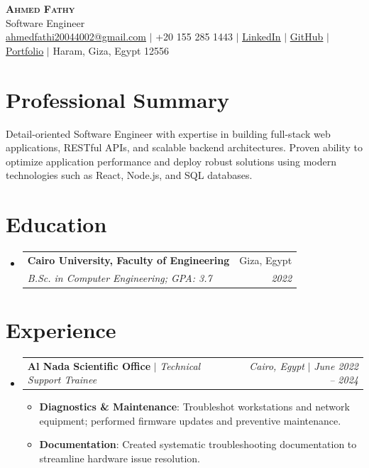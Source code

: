 \documentclass[letterpaper,11pt]{article}
\makeatletter
\newcommand{\resumeItem}[2]{\item\small{\textbf{#1}{: #2 \vspace{-2pt}}}}
\newcommand{\resumeSubheading}[4]{
  \vspace{-1pt}\item
    \begin{tabular*}{0.97\textwidth}{l@{\extracolsep{\fill}}r}
      \textbf{#1} & #2 \\
      \textit{\small#3} & \textit{\small #4} \\
    \end{tabular*}\vspace{-5pt}
}
\newcommand{\resumeActivitySubheading}[4]{
  \vspace{-1pt}\item
    \begin{tabular*}{0.97\textwidth}{l@{\extracolsep{\fill}}r}
      \textbf{#1} $|$ \textit{\small#3} & \textit{\small#2} $|$ \textit{\small #4} \\
    \end{tabular*}\vspace{-5pt}
}
\newcommand{\resumeSubHeadingListStart}{\begin{itemize}[leftmargin=*]}
\newcommand{\resumeSubHeadingListEnd}{\end{itemize}}
\newcommand{\resumeItemListStart}{\begin{itemize}}
\newcommand{\resumeItemListEnd}{\end{itemize}\vspace{-5pt}}
\makeatother
\begin{document}
\begin{center}
    \textbf{\Huge \scshape Ahmed Fathy} \\ \vspace{1pt}
    \small Software Engineer \\
    \href{mailto:ahmedfathi20044002@gmail.com}{\underline{ahmedfathi20044002@gmail.com}} $|$
    +20 155 285 1443 $|$
    \href{https://www.linkedin.com/in/ahmedfathy-x1}{\underline{LinkedIn}} $|$
    \href{https://github.com/ahmedfathy0-0}{\underline{GitHub}} $|$
    \href{https://www.mrfathi.tech/}{\underline{Portfolio}} $|$
    Haram, Giza, Egypt 12556
\end{center}


\section{Professional Summary}
  \small Detail-oriented Software Engineer with expertise in building full-stack web applications, RESTful APIs, and scalable backend architectures. Proven ability to optimize application performance and deploy robust solutions using modern technologies such as React, Node.js, and SQL databases.
  \vspace{8pt}
\section{Education}
  \resumeSubHeadingListStart
    \resumeSubheading
      {Cairo University, Faculty of Engineering}{Giza, Egypt}
      {B.Sc. in Computer Engineering;  GPA: 3.7}{2022}
  \resumeSubHeadingListEnd
\section{Experience}
  \resumeSubHeadingListStart
    \resumeActivitySubheading
      {Al Nada Scientific Office}{Cairo, Egypt}{Technical Support Trainee}{June 2022 -- 2024}
      \resumeItemListStart
        \resumeItem{Diagnostics \& Maintenance}
          {Troubleshot workstations and network equipment; performed firmware updates and preventive maintenance.}
        \resumeItem{Documentation}
          {Created systematic troubleshooting documentation to streamline hardware issue resolution.}
      \resumeItemListEnd
  \resumeSubHeadingListEnd
\end{document}
